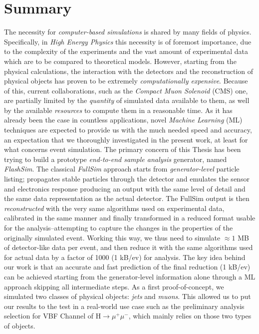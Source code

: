 \begingroup
\let\clearpage\relax
\let\cleardoublepage\relax
\let\cleardoublepage\relax

\chapter*{Summary}
The necessity for \emph{computer-based simulations} is shared by many fields of physics. Specifically, in \emph{High Energy Physics} this necessity is of foremost importance, due to the complexity of the experiments and the vast amount of experimental data which are to be compared to theoretical models. However, starting from the physical calculations, the interaction with the detectors and the reconstruction of physical objects has proven to be extremely \emph{computationally expensive}. Because of this, current collaborations, such as the \emph{Compact Muon Solenoid} (CMS) one, are partially limited by the \emph{quantity} of simulated data available to them, as well by the available \emph{resources} to compute them in a reasonable time. As it has already been the case in countless applications, novel \emph{Machine Learning} (ML) techniques are expected to provide us with the much needed speed and accuracy, an expectation that we thoroughly investigated in the present work, at least for what concerns event simulation. The primary concern of this Thesis has been trying to build a prototype \emph{end-to-end sample analysis} generator, named \emph{FlashSim}.
The classical \emph{FullSim} approach starts from \emph{generator-level} particle listing; propagates stable particles through the detector and emulates the sensor and electronics response producing an output with the same level of detail and the same data representation as the actual detector. The FullSim output is then \emph{reconstructed} with the very same algorithms used on experimental data, calibrated in the same manner and finally transformed in a reduced format usable for the analysis--attempting to capture the changes in the properties of the originally simulated event. Working this way, we thus need to simulate $\approx 1$ MB of detector-like data per event, and then reduce it with the same algorithms used for actual data by a factor of 1000 (1 kB/ev) for analysis.
The key idea behind our work is that an accurate and fast prediction of the final reduction (1 kB/ev) can be achieved starting from the generator-level information alone through a ML approach skipping all intermediate steps.
As a first proof-of-concept, we simulated two classes of physical objects: \emph{jets} and \emph{muons}. This allowed us to put our results to the test in a real-world use case such as the preliminary analysis selection for VBF Channel of H$\rightarrow\mu^+\mu^-$, which mainly relies on those two types of objects.



